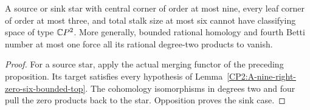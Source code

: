 \begin{corollary}
\label{CP2:A-star-nine-three-leaves-six-states}
A source or sink star with central corner of order at most nine,
every leaf corner of order at most three, and total stalk size at
most six cannot have classifying space of type $\mathbb{C}P^2$.
More generally, bounded rational homology and fourth Betti number
at most one force all its rational degree-two products to vanish.
\end{corollary}
\begin{proof}
For a source star, apply the actual merging functor of the
preceding proposition.  Its target satisfies every hypothesis
of Lemma~\ref{CP2:A-nine-right-zero-six-bounded-top}.  The
cohomology isomorphisms in degrees two and four pull the zero
products back to the star.  Opposition proves the sink case.
\end{proof}
